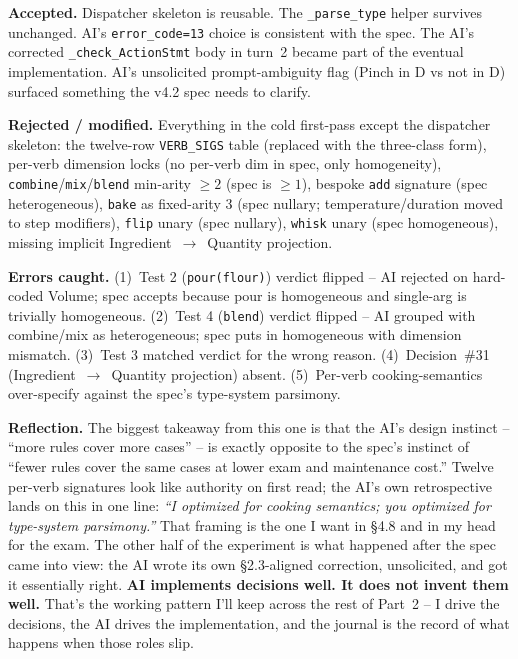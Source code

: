 \documentclass[11pt,a4paper]{article}
\newcommand{\field}[1]{\noindent\textbf{#1}}
\begin{document}
\field{Accepted.} Dispatcher skeleton is reusable. The
\texttt{\_parse\_type} helper survives unchanged. AI's
\texttt{error\_code=13} choice is consistent with the spec. The AI's
corrected \texttt{\_check\_ActionStmt} body in turn~2 became part of
the eventual implementation. AI's unsolicited prompt-ambiguity flag
(Pinch in D vs not in D) surfaced something the v4.2 spec needs to
clarify.

\field{Rejected / modified.} Everything in the cold first-pass except
the dispatcher skeleton: the twelve-row \texttt{VERB\_SIGS} table
(replaced with the three-class form), per-verb dimension locks (no
per-verb dim in spec, only homogeneity), \texttt{combine}/\texttt{mix}/\texttt{blend}
min-arity $\geq 2$ (spec is $\geq 1$), bespoke \texttt{add} signature
(spec heterogeneous), \texttt{bake} as fixed-arity 3 (spec nullary;
temperature/duration moved to step modifiers), \texttt{flip} unary
(spec nullary), \texttt{whisk} unary (spec homogeneous), missing
implicit Ingredient~$\to$~Quantity projection.

\field{Errors caught.} (1)~Test 2 (\texttt{pour(flour)}) verdict flipped
-- AI rejected on hard-coded Volume; spec accepts because pour is
homogeneous and single-arg is trivially homogeneous.
(2)~Test 4 (\texttt{blend}) verdict flipped -- AI grouped with combine/mix
as heterogeneous; spec puts in homogeneous with dimension mismatch.
(3)~Test 3 matched verdict for the wrong reason.
(4)~Decision~\#31 (Ingredient~$\to$~Quantity projection) absent.
(5)~Per-verb cooking-semantics over-specify against the spec's
type-system parsimony.

\field{Reflection.} The biggest takeaway from this one is that the
AI's design instinct -- ``more rules cover more cases'' -- is exactly
opposite to the spec's instinct of ``fewer rules cover the same cases
at lower exam and maintenance cost.'' Twelve per-verb signatures look
like authority on first read; the AI's own retrospective lands on this
in one line: \emph{``I optimized for cooking semantics; you optimized
for type-system parsimony.''} That framing is the one I want in
\S4.8 and in my head for the exam. The other half of the experiment
is what happened after the spec came into view: the AI wrote its own
\S2.3-aligned correction, unsolicited, and got it essentially right.
\textbf{AI implements decisions well. It does not invent them well.}
That's the working pattern I'll keep across the rest of Part~2 -- I
drive the decisions, the AI drives the implementation, and the
journal is the record of what happens when those roles slip.
\end{document}
